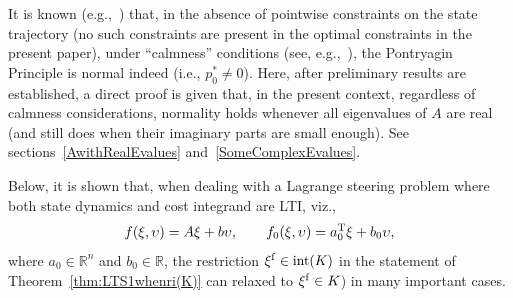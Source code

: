 \documentclass[letterpaper,10pt,conference]{ieeeconf}
\def\R{{\mathbb{R}}}
\begin{document}
It is known (e.g.,~\cite[p.258, l. -17 to -15]{BettiolFrankowska2007}) that, 
in the absence of pointwise constraints on the state trajectory (no such
constraints are present in the optimal constraints in the present paper), 
under ``calmness'' conditions (see, e.g.,~\cite[3rd equation in section 4.2; 
section 6.4]{Clarke1983}),
the Pontryagin Principle is normal indeed (i.e., $p^*_0\not=0$).
Here, after preliminary results are established, a direct proof
is given that, in the present context,
regardless of calmness considerations, normality holds whenever all 
eigenvalues of $A$ are real (and still does when their imaginary parts 
are small enough).  See sections~\ref{AwithRealEvalues} 
and~\ref{SomeComplexEvalues}.

Below, it is shown that, when dealing with a Lagrange steering
problem where both state dynamics and cost integrand are LTI,
viz.,
\begin{equation}
\label{eq:f,f0}
f(\xi,\upsilon)=A\xi+b\upsilon,
\qquad f_0(\xi,\upsilon)=a_0^{\rm T} \xi + b_0\upsilon, %
\end{equation}
where $a_0\in\R^n$ and $b_0\in\R$, the restriction $\xi^{\rm f}\in{\rm int}(K)$ 
in the statement of Theorem~\ref{thm:LTS1whenri(K)} can relaxed to
$\xi^{\rm f}\in K$) in many important cases.
\end{document}

